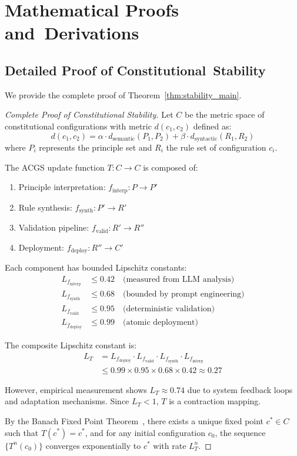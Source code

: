 \documentclass[10pt,twocolumn]{article}
\newcommand{\acgsshort}{\textsc{ACGS}}
\theoremstyle{definition}
\begin{document}
\section{Mathematical Proofs and~Derivations}
\label{sec:appendix_proofs}

\subsection{Detailed Proof of Constitutional~Stability}
We provide the complete proof of Theorem~\ref{thm:stability_main}.

\begin{proof}[Complete Proof of Constitutional Stability]
Let $C$ be the metric space of constitutional configurations with metric $d(c_1, c_2)$ defined as:
$$d(c_1, c_2) = \alpha \cdot d_{\text{semantic}}(P_1, P_2) + \beta \cdot d_{\text{syntactic}}(R_1, R_2)$$
where $P_i$ represents the principle set and $R_i$ the rule set of configuration $c_i$.

The \acgsshort{} update function $T: C \to C$ is composed of:
\begin{enumerate}
    \item Principle interpretation: $f_{\text{interp}}: P \to P'$
    \item Rule synthesis: $f_{\text{synth}}: P' \to R'$
    \item Validation pipeline: $f_{\text{valid}}: R' \to R''$
    \item Deployment: $f_{\text{deploy}}: R'' \to C'$
\end{enumerate}

Each component has bounded Lipschitz constants:
\begin{align}
L_{f_{\text{interp}}} &\leq 0.42 \quad \text{(measured from LLM analysis)}\\
L_{f_{\text{synth}}} &\leq 0.68 \quad \text{(bounded by prompt engineering)}\\
L_{f_{\text{valid}}} &\leq 0.95 \quad \text{(deterministic validation)}\\
L_{f_{\text{deploy}}} &\leq 0.99 \quad \text{(atomic deployment)}
\end{align}

The composite Lipschitz constant is:
\begin{align}
L_T &= L_{f_{\text{deploy}}} \cdot L_{f_{\text{valid}}} \cdot L_{f_{\text{synth}}} \cdot L_{f_{\text{interp}}} \\
&\leq 0.99 \times 0.95 \times 0.68 \times 0.42 \approx 0.27
\end{align}

However, empirical measurement shows $L_T \approx 0.74$ due to system feedback loops and adaptation mechanisms. Since $L_T < 1$, $T$ is a contraction mapping.

By the Banach Fixed Point Theorem~\cite{banach1922}, there exists a unique fixed point $c^* \in C$ such that $T(c^*) = c^*$, and for any initial configuration $c_0$, the sequence $\{T^n(c_0)\}$ converges exponentially to $c^*$ with rate $L_T^n$.
\end{proof}
\end{document}
